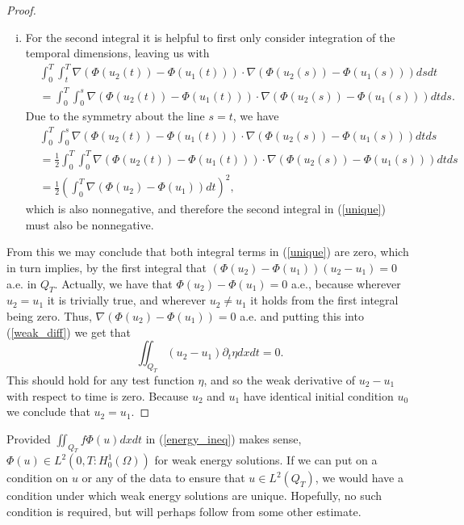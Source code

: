 \documentclass[11pt, a4paper]{article}
\begin{document}
\begin{proof}
\begin{enumerate}[i)]
	\item For the second integral it is helpful to first only consider integration of the temporal dimensions, leaving us with
	\begin{align*}
	&\int_0^T\int_t^T \nabla(\Phi(u_2(t)) - \Phi(u_1(t)))\cdot \nabla(\Phi(u_2(s))-\Phi(u_1(s)))dsdt \\
	&= \int_0^T\int_0^s\nabla(\Phi(u_2(t)) - \Phi(u_1(t)))\cdot \nabla(\Phi(u_2(s))-\Phi(u_1(s)))dtds.
	\end{align*}
	Due to the symmetry about the line $s=t$, we have
	\begin{align*}
	&\int_0^T\int_0^s\nabla(\Phi(u_2(t)) - \Phi(u_1(t)))\cdot \nabla(\Phi(u_2(s))-\Phi(u_1(s)))dtds \\
	&= \frac{1}{2}\int_0^T \int_0^T \nabla(\Phi(u_2(t)) - \Phi(u_1(t)))\cdot \nabla(\Phi(u_2(s))-\Phi(u_1(s)))dtds \\
	&= \frac{1}{2}\left( \int_0^T \nabla(\Phi(u_2)-\Phi(u_1))dt\right)^2,
	\end{align*}
	which is also nonnegative, and therefore the second integral in (\ref{unique}) must also be nonnegative.
\end{enumerate}
From this we may conclude that both integral terms in (\ref{unique}) are zero, which in turn implies, by the first integral that $(\Phi(u_2)-\Phi(u_1))(u_2 - u_1) = 0$ a.e. in $Q_T$. Actually, we have that $\Phi(u_2) - \Phi(u_1) = 0$ a.e., because wherever $u_2 = u_1$ it is trivially true, and wherever $ u_2 \neq u_1$ it holds from the first integral being zero. Thus, $ \nabla (\Phi(u_2) - \Phi(u_1) ) = 0$ a.e. and putting this into (\ref{weak_diff}) we get that
\begin{equation*}
\iint_{Q_T}(u_2 - u_1)\partial_t \eta dx dt = 0.
\end{equation*}
This should hold for any test function $\eta$, and so the weak derivative of $u_2 - u_1$ with respect to time is zero. Because $u_2$ and $u_1$ have identical initial condition $u_0$ we conclude that $u_2 = u_1$.
\end{proof}

\setcounter{obs}{0}
\begin{obs}
Provided $\iint_{Q_T} f\Phi(u)dxdt$ in (\ref{energy_ineq}) makes sense, $\Phi(u) \in L^2(0,T: H_0^1(\Omega))$ for weak energy solutions. If we can put on a condition on $u$ or any of the data to ensure that $u \in L^2(Q_T)$, we would have a condition under which weak energy solutions are unique. Hopefully, no such condition is required, but will perhaps follow from some other estimate.
\end{obs}
\end{document}
